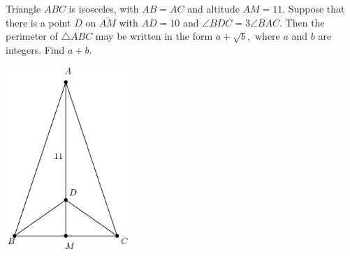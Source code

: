 Triangle $ABC$ is isosceles, with $AB=AC$ and altitude $AM=11.$  Suppose that there is a point $D$ on $\overline{AM}$ with $AD=10$ and $\angle BDC=3\angle BAC.$  Then the perimeter of $\triangle ABC$ may be written in the form $a+\sqrt{b},$ where $a$ and $b$ are integers.  Find $a+b.$

\begin{center}
\includegraphics[width = 47.0mm]{img/fig0.png}
\end{center}